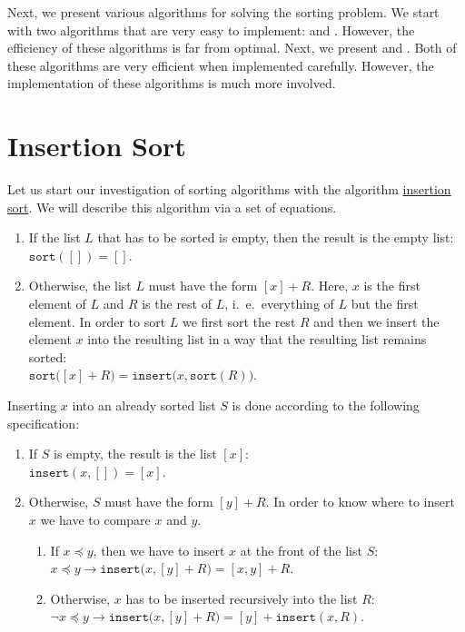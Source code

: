 Next, we present various algorithms for solving the sorting problem.  We start with two algorithms
that are very easy to implement:  and .  However, the
efficiency of these algorithms is far from optimal.  Next, we present  and 
.  Both of these algorithms are very efficient when implemented carefully.
However, the implementation of these algorithms is much more involved.


\section{Insertion Sort \label{chap:insertionSort}}
Let us start our investigation of sorting algorithms with the algorithm
\href{http://en.wikipedia.org/wiki/Insertion_sort}{insertion sort}.  We will describe this
algorithm via a set of equations.
\begin{enumerate}
\item If the list $L$ that has to be sorted is empty, then the result is the empty list: 
      \\[0.2cm]
      \hspace*{1.3cm}
      $\mathtt{sort}([]) = []$.
\item Otherwise, the list $L$ must have the form $[x] + R$. Here, $x$ is the first element of $L$
      and $R$ is the rest of $L$, i.~e.~everything of $L$ but the first element.  In order to sort
      $L$ we first sort the rest $R$ and then we insert the element $x$ into the resulting list in a
      way that the resulting list remains sorted:
      \\[0.2cm]
      \hspace*{1.3cm} $\mathtt{sort}\bigl([x] + R\bigr) = \mathtt{insert}\bigl(x, \mathtt{sort}(R)\bigr)$.
\end{enumerate}
Inserting $x$ into an already sorted list $S$ is done according to the following specification:
\begin{enumerate}
\item If $S$ is empty, the result is the list $[x]$: \\[0.2cm]
      \hspace*{1.3cm}
      $\mathtt{insert}(x,[]) = [x]$.
\item Otherwise, $S$ must have the form $[y] + R$.  In order to know where to insert $x$ we have to
      compare $x$ and $y$.
      \begin{enumerate}
      \item If $x \preceq y$, then we have to insert $x$ at the front of the list $S$: \\[0.2cm]
            \hspace*{1.3cm}
            $x \preceq y \rightarrow \mathtt{insert}\bigl(x, [y] + R\bigr) = [x,y] + R$. 
      \item Otherwise, $x$ has to be inserted recursively into the list $R$: \\[0.2cm]
            \hspace*{1.3cm}
            $\neg x \preceq y \rightarrow \mathtt{insert}\bigl(x, [y] + R\bigr) = [y] + \mathtt{insert}(x,R)$. 
      \end{enumerate}
\end{enumerate}

